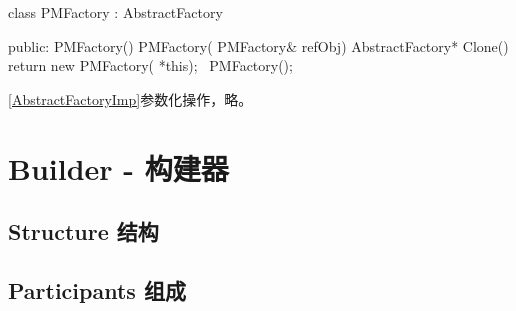 \begin{schemedisplay}

class PMFactory : AbstractFactory
{
	public:
		PMFactory(){}
		PMFactory( PMFactory& refObj){}
		AbstractFactory* Clone()
		{
			return new PMFactory( *this);
		}
		~PMFactory();
	
}

\end{schemedisplay}

\ref{AbstractFactoryImp}参数化操作，略。

\section{Builder - 构建器}

\subsection{Structure 结构}


\subsection{Participants 组成}

